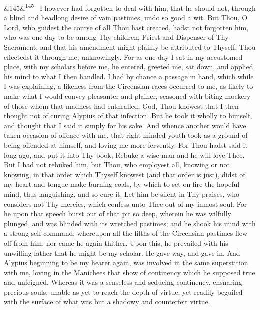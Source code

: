 \documentclass[12pt]{article}
\newcommand{\para}[1][]{\par\noindent\ifx&#1&\else\textsuperscript{\footnotesize #1}~\fi}
\begin{document}
\para[145] I however had forgotten to deal with him, that he should not, through a blind and headlong desire of vain pastimes, undo so good a wit. But Thou, O Lord, who guidest the course of all Thou hast created, hadst not forgotten him, who was one day to be among Thy children, Priest and Dispenser of Thy Sacrament; and that his amendment might plainly be attributed to Thyself, Thou effectedst it through me, unknowingly. For as one day I sat in my accustomed place, with my scholars before me, he entered, greeted me, sat down, and applied his mind to what I then handled. I had by chance a passage in hand, which while I was explaining, a likeness from the Circensian races occurred to me, as likely to make what I would convey pleasanter and plainer, seasoned with biting mockery of those whom that madness had enthralled; God, Thou knowest that I then thought not of curing Alypius of that infection. But he took it wholly to himself, and thought that I said it simply for his sake. And whence another would have taken occasion of offence with me, that right-minded youth took as a ground of being offended at himself, and loving me more fervently. For Thou hadst said it long ago, and put it into Thy book, Rebuke a wise man and he will love Thee. But I had not rebuked him, but Thou, who employest all, knowing or not knowing, in that order which Thyself knowest (and that order is just), didst of my heart and tongue make burning coals, by which to set on fire the hopeful mind, thus languishing, and so cure it. Let him be silent in Thy praises, who considers not Thy mercies, which confess unto Thee out of my inmost soul. For he upon that speech burst out of that pit so deep, wherein he was wilfully plunged, and was blinded with its wretched pastimes; and he shook his mind with a strong self-command; whereupon all the filths of the Circensian pastimes flew off from him, nor came he again thither. Upon this, he prevailed with his unwilling father that he might be my scholar. He gave way, and gave in. And Alypius beginning to be my hearer again, was involved in the same superstition with me, loving in the Manichees that show of continency which he supposed true and unfeigned. Whereas it was a senseless and seducing continency, ensnaring precious souls, unable as yet to reach the depth of virtue, yet readily beguiled with the surface of what was but a shadowy and counterfeit virtue.
\end{document}
